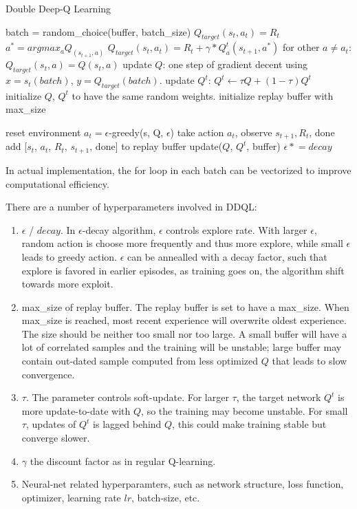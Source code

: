 \documentclass[conference]{IEEEtran}
\newcommand{\asteq}{\mathrel{*}=}
\begin{document}
\begin{algorithm}[h!]
	\caption{Double Deep-Q Learning}
	\begin{algorithmic}
		\State batch = random\_choice(buffer, batch\_size)
				\State $Q_{target}(s_t, a_t) = R_t$
			\Else
				\State $a^* = argmax_a Q_(s_{t+1}, a)$
				\State $Q_{target}(s_t, a_t) = R_t + \gamma * Q^t_a(s_{t+1}, a^*)$
			\EndIf
			\State for other $a\neq a_t$: $Q_{target}(s_t, a) = Q(s_t, a)$
		\EndFor
		\State update $Q$: one step of gradient decent using $x=s_t(batch)$, $y=Q_{target}(batch)$.
		\State update $Q^t$: $Q^t \leftarrow \tau Q + (1-\tau) Q^t$
		\EndFunction
		\\
		\State initialize $Q$, $Q^t$ to have the same random weights.
		\State initialize replay buffer with max\_size
		
			\State reset environment
				\State $a_t = \epsilon$-greedy(s, Q, $\epsilon$)
				\State take action $a_t$, observe $s_{t+1}, R_{t}$, done
				\State add [$s_t$, $a_t$, $R_t$, $s_{t+1}$, done] to replay buffer
				\State update($Q$, $Q^t$, buffer)
			\EndFor			
			\State $\epsilon \asteq decay$
		\EndFor
		\EndFunction
	\end{algorithmic}
	\label{algo:ddql}
\end{algorithm}

In actual implementation, the for loop in each batch can be vectorized to improve computational efficiency.

There are a number of hyperparameters involved in DDQL:
\begin{enumerate}
\item $\epsilon$ / $decay$. In $\epsilon$-decay algorithm, $\epsilon$ controls explore rate. With larger $\epsilon$, random action is choose more frequently and thus more explore, while small $\epsilon$ leads to greedy action. $\epsilon$ can be annealled with a decay factor, such that explore is favored in earlier episodes, as training goes on, the algorithm shift towards more exploit.
\item max\_size of replay buffer. The replay buffer is set to have a max\_size. When max\_size is reached, most recent experience will overwrite oldest experience. The size should be neither too small nor too large. A small buffer will have a lot of correlated samples and the training will be unstable; large buffer may contain out-dated sample computed from less optimized $Q$ that leads to slow convergence.
\item $\tau$. The parameter controls soft-update. For larger $\tau$, the target network $Q^t$ is more update-to-date with $Q$, so the training may become unstable. For small $\tau$, updates of $Q^t$ is lagged behind $Q$, this could make training stable but converge slower.
\item $\gamma$ the discount factor as in regular Q-learning.
\item Neural-net related hyperparamters, such as network structure, loss function, optimizer, learning rate $lr$, batch-size, etc.
\end{enumerate}
	
\end{document}
